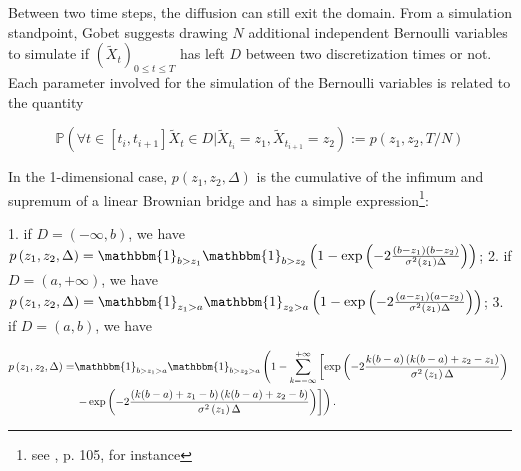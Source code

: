 \begin{enumerate}



Between two time steps, the diffusion can still exit the domain. From a simulation standpoint, Gobet suggests drawing $N$ additional independent Bernoulli variables to simulate if $\left(\tilde{X}_{t}\right)_{0 \leq t \leq T}$ has left $D$ between two discretization times or not. Each parameter involved for the simulation of the Bernoulli variables is related to the quantity

$$
\mathbb{P}\left(\forall t \in\left[t_{i}, t_{i+1}\right] \tilde{X}_{t} \in D \vert \tilde{X}_{t_{i}}=z_{1}, \tilde{X}_{t_{i+1}}=z_{2}\right):=p\left(z_{1}, z_{2}, T / N\right)
$$

In the 1-dimensional case, $p\left(z_{1}, z_{2}, \Delta\right)$ is the cumulative of the infimum and supremum of a linear Brownian bridge and has a simple expression\footnote{see \cite{revuz2013continuous}, p. 105, for instance}:

1. if $D=(-\infty, b)$, we have $p\left(z_{1}, z_{2}, \Delta\right)=\mathbbm{1}_{b>z_{1}} \mathbbm{1}_{b>z_{2}}\left(1-\exp \left(-2 \frac{\left(b-z_{1}\right)\left(b-z_{2}\right)}{\sigma^{2}\left(z_{1}\right) \Delta}\right)\right)$;
2. if $D=(a,+\infty)$, we have $p\left(z_{1}, z_{2}, \Delta\right)=\mathbbm{1}_{z_{1}>a} \mathbbm{1}_{z_{2}>a}\left(1-\exp \left(-2 \frac{\left(a-z_{1}\right)\left(a-z_{2}\right)}{\sigma^{2}\left(z_{1}\right) \Delta}\right)\right)$;
3. if $D=(a, b)$, we have

$$
\begin{aligned}
p\left(z_{1}, z_{2}, \Delta\right)= & \mathbbm{1}_{b>z_{1}>a} \mathbbm{1}_{b>z_{2}>a}\left(1-\sum_{k=-\infty}^{+\infty}\left[\exp \left(-2 \frac{k(b-a)\left(k(b-a)+z_{2}-z_{1}\right)}{\sigma^{2}\left(z_{1}\right) \Delta}\right)\right.\right. \\
& \left.\left.-\exp \left(-2 \frac{\left(k(b-a)+z_{1}-b\right)\left(k(b-a)+z_{2}-b\right)}{\sigma^{2}\left(z_{1}\right) \Delta}\right)\right]\right) .
\end{aligned}
$$

\end{enumerate}

